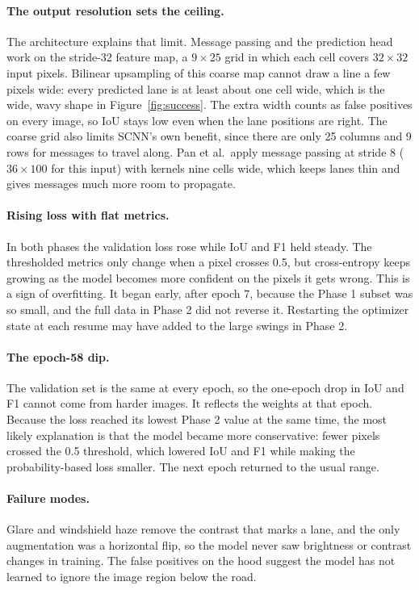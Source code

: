 \documentclass[11pt]{article}
\begin{document}
\paragraph{The output resolution sets the ceiling.} The architecture explains that limit. Message
passing and the prediction head work on the stride-32 feature map, a $9\times25$ grid in which each
cell covers $32\times32$ input pixels. Bilinear upsampling of this coarse map cannot draw a line a few
pixels wide: every predicted lane is at least about one cell wide, which is the wide, wavy shape in
Figure~\ref{fig:success}. The extra width counts as false positives on every image, so IoU stays
low even when the lane positions are right. The coarse grid also limits SCNN's own benefit, since
there are only 25 columns and 9 rows for messages to travel along. Pan et al.\ apply message passing
at stride 8 ($36\times100$ for this input) with kernels nine cells wide, which keeps lanes thin and
gives messages much more room to propagate.

\paragraph{Rising loss with flat metrics.} In both phases the validation loss rose while IoU and F1
held steady. The thresholded metrics only change when a pixel crosses 0.5, but cross-entropy keeps
growing as the model becomes more confident on the pixels it gets wrong. This is a sign of
overfitting. It began early, after epoch 7, because the Phase 1 subset was so small, and the full
data in Phase 2 did not reverse it. Restarting the optimizer state at each resume may have added to
the large swings in Phase 2.

\paragraph{The epoch-58 dip.} The validation set is the same at every epoch, so the one-epoch drop in
IoU and F1 cannot come from harder images. It reflects the weights at that epoch. Because the loss
reached its lowest Phase 2 value at the same time, the most likely explanation is that the model
became more conservative: fewer pixels crossed the 0.5 threshold, which lowered IoU and F1 while
making the probability-based loss smaller. The next epoch returned to the usual range.

\paragraph{Failure modes.} Glare and windshield haze remove the contrast that marks a lane, and the
only augmentation was a horizontal flip, so the model never saw brightness or contrast changes in
training. The false positives on the hood suggest the model has not learned to ignore the image
region below the road.
\end{document}
